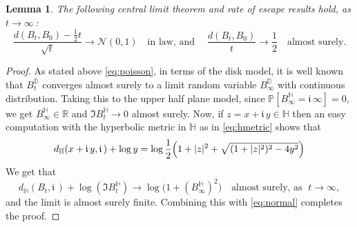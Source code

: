 \documentclass[12pt]{amsart}
\newcommand\DD{\mathbb D}
\newcommand\HH{\mathbb H}
\newcommand\im{\mathfrak{i}\,}
\newcommand\Prob{\mathbb P}
\newcommand\R{\mathbb R}
\newcommand\ro{d}
\numberwithin{theorem}{section}
\newtheorem{lem}[theorem]{Lemma}%
\theoremstyle{definition}
\begin{document}
\begin{lem}\label{lem:speed}  The following central limit theorem and 
rate of escape results hold, as $t \to \infty\,$:
$$
\frac{\ro(B_t,B_0)- \frac12 t}{\sqrt{t}} \to \mathcal{N}(0,1) \quad \text{in law, and}\;\quad 
\frac{\ro(B_t,B_0)}{t} \to \frac12 \quad \text{almost surely.}
$$
\end{lem}

\begin{proof}
As stated above \eqref{eq:poisson}, in terms of the disk model, it is well known that $B_t^{\DD}$ 
converges almost surely to a limit random variable $B_{\infty}^{\DD}$  with continuous distribution.
Taking this to the upper half plane model, since $\Prob[B_{\infty}^{\HH} = \im \infty]=0$, 
we get $B_{\infty}^{\HH} \in \R$ and $\Im B_t^{\HH} \to 0$ almost surely.  
Now, if $z = x + \im y \in \HH$
then an easy computation with the hyperbolic metric in $\HH$ as in \eqref{eq:hmetric} shows that 
\begin{equation}\label{eq:rhodiff}
\ro_{\HH}(x + \im y, \im) + \log y = %
\log\frac12 \Bigl(1 + |z|^2 + \sqrt{(1 + |z|^2)^2-4y^2}\Bigr)
\end{equation}
We get that 
$$
\ro_{\HH}(B_t, \im) + \log (\Im B_t^{\HH}) \to \log\bigl(1+ (B_{\infty}^{\HH})^2\bigr) 
\quad \text{almost surely, as }\; t \to \infty, 
$$
and the limit is almost surely finite. Combining this with \eqref{eq:normal}
completes the proof.
\end{proof}
\end{document}

